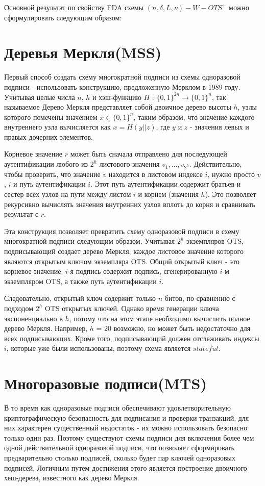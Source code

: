 \documentclass[a4paper, 14pt]{extarticle}
\begin{document}
Основной результат по свойству FDA схемы $(n, \delta, L, \nu)-W-OTS^{+}$ можно сформулировать следующим образом:
\newpage

\section{Деревья Меркля(MSS)}
Первый способ создать схему многократной подписи из схемы одноразовой подписи - использовать конструкцию, предложенную Мерклом в 1989 году. Учитывая целые числа $n$, $h$ и хэш-функцию $H$ : $\{0, 1\}^{2n} \rightarrow \{0, 1\}^{n}$, так называемое Дерево Меркля представляет собой двоичное дерево высоты $h$, узлы которого помечены значением $x \in \{0, 1\}^{n}$, таким образом, что значение каждого внутреннего узла вычисляется как $x = H(y||z)$, где $y$ и $z$ - значения левых и правых дочерних элементов.

Корневое значение $r$ может быть сначала отправлено для последующей аутентификации любого из $2^{h}$ листового значения $v_{1}, ..., v_{2^h}$. Действительно, чтобы проверить, что значение $v$ находится в листовом индексе $i$, нужно просто $v$, $i$ и путь аутентификации $i$. Этот путь аутентификации содержит братьев и сестер всех узлов на пути между листом $i$ и корнем (значения $h$). Это позволяет рекурсивно вычислять значения внутренних узлов вплоть до корня и сравнивать результат с $r$.

Эта конструкция позволяет превратить схему одноразовой подписи в схему многократной подписи следующим образом. Учитывая $2^h$ экземпляров OTS, подписывающий создает дерево Меркля, каждое листовое значение которого являются открытым ключом экземпляра OTS. Общий открытый ключ - это корневое значение. $i$-я подпись содержит подпись, сгенерированную $i$-м экземпляром OTS, а также путь аутентификации $i$.

Следовательно, открытый ключ содержит только $n$ битов, по сравнению с подходом $2^h$ OTS открытых ключей. Однако время генерации ключа экспоненциально в $h$, потому что на этом этапе необходимо вычислить полное дерево Меркля. Например, $h$ = 20 возможно, но может быть недостаточно для всех подписывающих. Кроме того, подписывающий должен отслеживать индексы $i$, которые уже были использованы, поэтому схема является $stateful$.
\newpage

\section{Многоразовые подписи(MTS)}
В то время как одноразовые подписи обеспечивают удовлетворительную криптографическую безопасность для подписания и проверки транзакций, для них характерен существенный недостаток - их можно использовать безопасно только один раз. Поэтому существуют схемы подписи для включения более чем одной действительной одноразовой подписи, что позволяет сформировать предварительно столько подписей, сколько будет пар ключей одноразовых подписей. Логичным путем достижения этого является построение двоичного хеш-дерева, известного как дерево Меркля.
\end{document}
